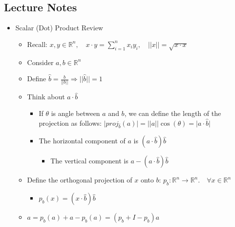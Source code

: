 \documentclass{article}
\begin{document}
\subsection{Lecture Notes}
\begin{itemize}
    \item Scalar (Dot) Product Review
    \begin{itemize}
        \item Recall: $x,y \in \mathbb{R}^n, \quad x \cdot y = \sum_{i=1}^n x_i y_i, \quad \vert \vert x \vert \vert = \sqrt{x \cdot x}$
        \item Consider $a,b \in \mathbb{R}^n$
        \item Define $\hat{b} = \frac{b}{\vert \vert b \vert \vert} \Rightarrow \vert \vert \hat{b}  \vert \vert = 1$
        \item Think about $a \cdot \hat{b}$
        \begin{itemize}
            \item If $\theta$ is angle between $a$ and $b$, we can define the length of the projection as follows: $\vert proj_{\hat{b}}(a) \vert = \vert \vert a \vert \vert \cos(\theta) = \vert a \cdot \hat{b} \vert$
            \item The horizontal component of $a$ is $(a \cdot \hat{b})\hat{b}$
            \begin{itemize}
                \item The vertical component is $a - (a \cdot \hat{b})\hat{b}$
            \end{itemize}
        \end{itemize}
        \item Define the orthogonal projection of $x$ onto $b$: $p_b : \mathbb{R}^n \rightarrow \mathbb{R}^n. \quad \forall x \in \mathbb{R}^n$
        \begin{itemize}
            \item $p_b(x) = (x \cdot \hat{b})\hat{b}$
        \end{itemize}
        \item $a = p_b(a) + a - p_b(a) = (p_b + I - p_b)a$
    \end{itemize}
\end{itemize}
\end{document}
